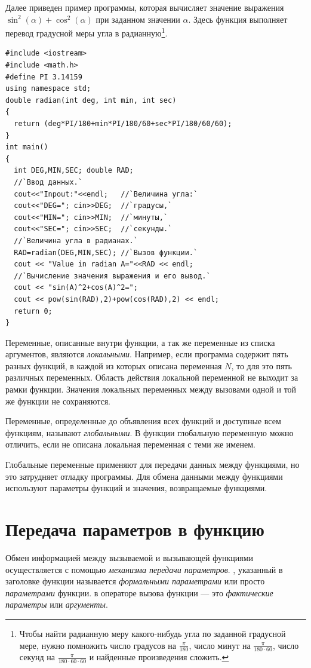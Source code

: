 Далее приведен пример программы, которая вычисляет значение выражения  
$\sin^2(\alpha)+\cos^2(\alpha)$ при заданном значении  $\alpha$. Здесь функция  выполняет
перевод градусной меры угла в радианную\footnote{Чтобы найти радианную меру какого-нибудь угла по заданной градусной
мере, нужно помножить число градусов на  $\frac{\pi}{180}$, число минут на  $\frac{\pi}{180\cdot 60}$, число секунд
на $\frac{\pi}{180\cdot 60\cdot 60}$ и найденные произведения сложить.}.
\begin{lstlisting}
#include <iostream>
#include <math.h>
#define PI 3.14159
using namespace std;
double radian(int deg, int min, int sec)
{
  return (deg*PI/180+min*PI/180/60+sec*PI/180/60/60);
}
int main()
{
  int DEG,MIN,SEC; double RAD;
  //`Ввод данных.`
  cout<<"Inpout:"<<endl;   //`Величина угла:`
  cout<<"DEG="; cin>>DEG;  //`градусы,`
  cout<<"MIN="; cin>>MIN;  //`минуты,`
  cout<<"SEC="; cin>>SEC;  //`секунды.`
  //`Величина угла в радианах.`
  RAD=radian(DEG,MIN,SEC); //`Вызов функции.`
  cout << "Value in radian A="<<RAD << endl;
  //`Вычисление значения выражения и его вывод.`
  cout << "sin(A)^2+cos(A)^2=";
  cout << pow(sin(RAD),2)+pow(cos(RAD),2) << endl;
  return 0;
}
\end{lstlisting}


Переменные, описанные внутри функции, а так же переменные из списка аргументов, являются
\emph{локальными}. Например, если программа содержит пять разных функций, в
каждой из которых описана переменная $N$, то для  это пять различных переменных. Область действия локальной переменной
не выходит за рамки функции. Значения локальных переменных между вызовами одной и той же функции не сохраняются. 

Переменные, определенные до объявления всех функций и доступные всем функциям, называют
\emph{глобальными}. В функции глобальную переменную можно отличить, если не
описана локальная переменная с теми же именем.

Глобальные переменные применяют для передачи данных между функциями, но это затрудняет отладку программы. Для обмена
данными между функциями используют параметры функций и значения, возвращаемые функциями.

\section[Передача параметров в функцию]{Передача параметров в функцию}
Обмен информацией между вызываемой и вызывающей функциями осуществляется с помощью \emph{механизма передачи параметров}. , указанный в
заголовке функции называется \emph{формальными параметрами} или просто
\emph{параметрами} функции.  в операторе вызова функции --- это
\emph{фактические параметры} или \emph{аргументы}. 

